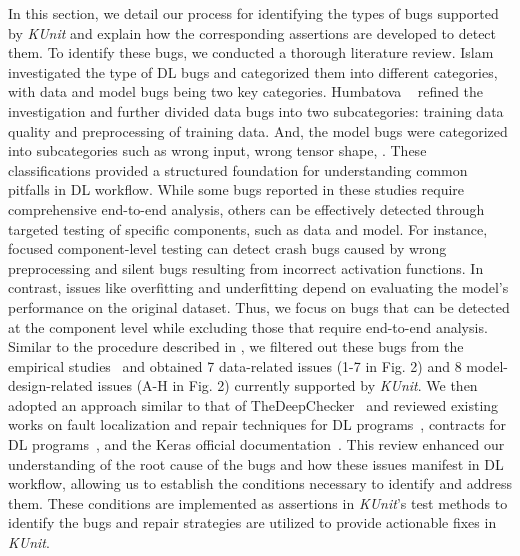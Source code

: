 In this section, we detail our process for identifying the types of bugs supported by {\em KUnit} and explain how the corresponding assertions are developed to detect them. To identify these bugs, we conducted a thorough literature review. 
Islam \etal~\cite{islam19} investigated the type of DL bugs and categorized them into different categories, with data and model bugs being two key categories. Humbatova \etal~\cite{humbatova20taxonomy} refined the investigation and further divided data bugs into two subcategories:
training data quality and preprocessing of training data. And, the model bugs were categorized into subcategories such as wrong input, wrong tensor shape, \etc. These classifications provided a structured foundation for understanding common pitfalls in DL workflow. While some bugs reported in these studies require comprehensive end-to-end analysis, others can be effectively detected through targeted testing of specific components, such as data and model. For instance, focused component-level testing can detect crash bugs caused by wrong preprocessing and silent bugs resulting from incorrect activation functions. In contrast, issues like overfitting and underfitting depend on evaluating the model's performance on the original dataset. Thus, we focus on bugs that can be detected at the component level while excluding those that require end-to-end analysis. Similar to the procedure described in \cite{BraiekDeepChecker,ghanbari2023deepmufl}, we filtered out these bugs from the empirical studies~\cite{islam19,humbatova20taxonomy}  and obtained 7 data-related issues (1-7 in Fig. 2) and 8 model-design-related issues (A-H in Fig. 2) currently supported by {\em KUnit}. 
We then adopted an approach similar to that of TheDeepChecker~\cite{BraiekDeepChecker} and reviewed existing works on fault localization and repair
techniques for DL programs~\cite{wardat21DeepLocalize, wardat22DeepDiagnosis, cao2022deepfd, Zhang21Autotrainer, nikanjam2021neuralint, manke2024leveraging, wardat2023localizing, islam20repairing}, contracts for DL programs~\cite{ahmed23dlcontract, Khairunnesa2023}, and the Keras official documentation~\cite{Keras,kerasexamples}. This review enhanced our understanding of the root cause of the bugs and how these issues manifest in DL workflow, allowing us to establish the conditions necessary to identify and address them. These conditions are implemented as assertions in {\em KUnit}'s test methods to identify the bugs and repair strategies are utilized to provide actionable fixes in {\em KUnit}.




